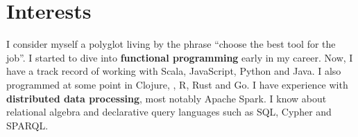 \documentclass[letterpaper]{cv} %
\begin{document}








\makeprofile %


\section{Interests}

I consider myself a polyglot living by the phrase
``choose the best tool for the job''. I started to dive into \textbf{functional programming} early in my career.
Now, I have a track record of working with Scala, JavaScript, Python and Java. I also programmed at
some point in Clojure, \cpp{}, R, Rust and Go. I have experience with \textbf{distributed data processing},
most notably Apache Spark. I know about relational algebra and declarative query languages
such as SQL, Cypher and SPARQL.
\end{document}
